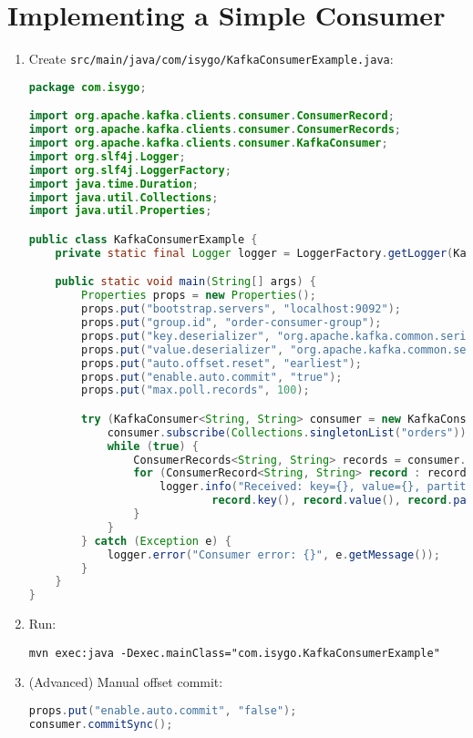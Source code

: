 \documentclass[12pt,a4paper]{report}
\begin{document}
\section{Implementing a Simple Consumer}
\begin{enumerate}
    \item Create \texttt{src/main/java/com/isygo/KafkaConsumerExample.java}:
\begin{lstlisting}[language=java]
package com.isygo;

import org.apache.kafka.clients.consumer.ConsumerRecord;
import org.apache.kafka.clients.consumer.ConsumerRecords;
import org.apache.kafka.clients.consumer.KafkaConsumer;
import org.slf4j.Logger;
import org.slf4j.LoggerFactory;
import java.time.Duration;
import java.util.Collections;
import java.util.Properties;

public class KafkaConsumerExample {
    private static final Logger logger = LoggerFactory.getLogger(KafkaConsumerExample.class);

    public static void main(String[] args) {
        Properties props = new Properties();
        props.put("bootstrap.servers", "localhost:9092");
        props.put("group.id", "order-consumer-group");
        props.put("key.deserializer", "org.apache.kafka.common.serialization.StringDeserializer");
        props.put("value.deserializer", "org.apache.kafka.common.serialization.StringDeserializer");
        props.put("auto.offset.reset", "earliest");
        props.put("enable.auto.commit", "true");
        props.put("max.poll.records", 100);

        try (KafkaConsumer<String, String> consumer = new KafkaConsumer<>(props)) {
            consumer.subscribe(Collections.singletonList("orders"));
            while (true) {
                ConsumerRecords<String, String> records = consumer.poll(Duration.ofMillis(100));
                for (ConsumerRecord<String, String> record : records) {
                    logger.info("Received: key={}, value={}, partition={}, offset={}",
                            record.key(), record.value(), record.partition(), record.offset());
                }
            }
        } catch (Exception e) {
            logger.error("Consumer error: {}", e.getMessage());
        }
    }
}
\end{lstlisting}
    \item Run:
    \begin{lstlisting}
mvn exec:java -Dexec.mainClass="com.isygo.KafkaConsumerExample"
    \end{lstlisting}
    \item (Advanced) Manual offset commit:
    \begin{lstlisting}[language=java]
props.put("enable.auto.commit", "false");
consumer.commitSync();
\end{lstlisting}
\end{enumerate}
\end{document}
